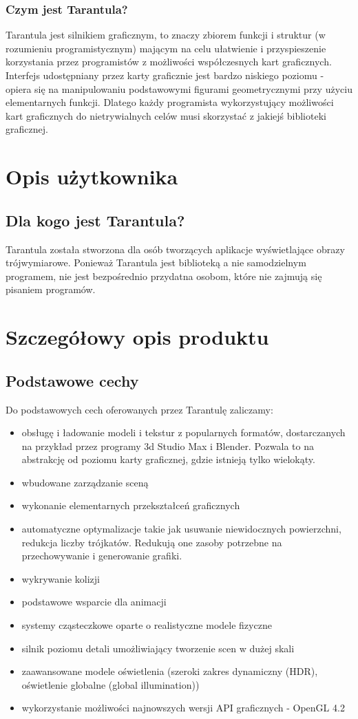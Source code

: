 \documentclass[11pt,leqno]{article}
\begin{document}
\subsubsection{Czym jest Tarantula?}
\noindent
Tarantula jest silnikiem graficznym, to znaczy zbiorem funkcji i struktur (w rozumieniu programistycznym) mającym 
na celu ułatwienie i przyspieszenie korzystania przez programistów z możliwości współczesnych kart graficznych. 
Interfejs udostępniany przez karty graficznie jest bardzo niskiego poziomu - 
opiera się na manipulowaniu podstawowymi figurami geometrycznymi przy użyciu elementarnych funkcji.
Dlatego każdy programista wykorzystujący możliwości kart graficznych do nietrywialnych celów musi skorzystać z jakiejś biblioteki graficznej.

\section{Opis użytkownika}
\subsection{Dla kogo jest Tarantula?}
\noindent
Tarantula została stworzona dla osób tworzących aplikacje wyświetlające obrazy trójwymiarowe. Ponieważ Tarantula jest biblioteką a nie samodzielnym programem, 
nie jest bezpośrednio przydatna osobom, które nie zajmują się pisaniem programów.

\section{Szczegółowy opis produktu}

\subsection{Podstawowe cechy}
Do podstawowych cech oferowanych przez Tarantulę zaliczamy:
\begin{itemize}
 \item obsługę i ładowanie modeli i tekstur z popularnych formatów, dostarczanych na przykład przez programy 3d Studio Max i Blender. 
 Pozwala to na abstrakcję od poziomu karty graficznej, gdzie istnieją tylko wielokąty.
  \item wbudowane zarządzanie sceną
\item wykonanie elementarnych przekształceń graficznych
\item automatyczne optymalizacje takie jak usuwanie niewidocznych powierzchni, redukcja liczby trójkatów. Redukują one zasoby potrzebne na przechowywanie i generowanie grafiki.
\item wykrywanie kolizji
\item podstawowe wsparcie dla animacji
\item systemy cząsteczkowe oparte o realistyczne modele fizyczne
\item silnik poziomu detali umożliwiający tworzenie scen w dużej skali
\item zaawansowane modele oświetlenia (szeroki zakres dynamiczny (HDR), oświetlenie globalne (global illumination))
\item wykorzystanie możliwości najnowszych wersji API graficznych  - OpenGL 4.2
\end{itemize}
\end{document}

